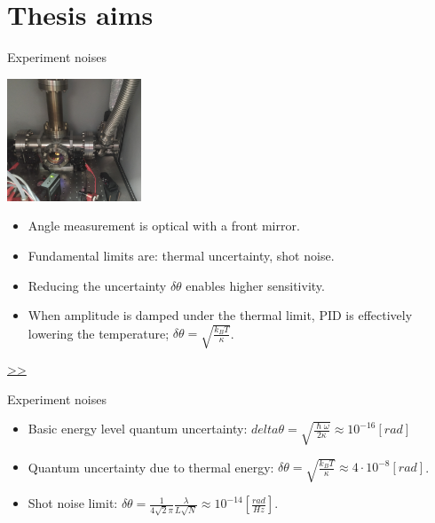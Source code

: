 \documentclass{beamer}
\begin{document}
\section{Thesis aims}
\begin{frame}{Experiment noises}
	\begin{center}		
		\includegraphics[width=0.3\textwidth,keepaspectratio]{actual system_crop.jpg}
    \end{center}
	\begin{itemize}
		
		\item Angle measurement is optical with a front mirror.
		\item Fundamental limits are: thermal uncertainty, shot noise. 
		\pause
		\item Reducing the uncertainty $\delta\theta$ enables higher sensitivity.
		\item When amplitude is damped under the thermal limit, PID is effectively lowering the temperature; $\delta\theta = \sqrt{\frac{k_B T}{\kappa}}$. 
		
		
	\end{itemize}
	\hyperlink{frame:Gravimetric measurement}{>>} 
\end{frame}
\begin{frame}{Experiment noises}
	\begin{itemize}
		\framesubtitle{Fundamental limits}
		\item Basic energy level quantum uncertainty: $delta\theta= \sqrt{\frac{\hslash\omega}{2\kappa}} \approx 10^{-16} [rad]$
		\item Quantum uncertainty due to thermal energy: $\delta\theta = \sqrt{\frac{k_B T}{\kappa}} \approx 4\cdot 10^{-8} [rad]$.
		\item Shot noise limit: $\delta\theta = \frac{1}{4\sqrt{2}\pi}\frac{\lambda}{L\sqrt{N}} \approx 10^{-14} [\frac{rad}{Hz}]$.
		
	\end{itemize}
\end{frame}
\end{document}
